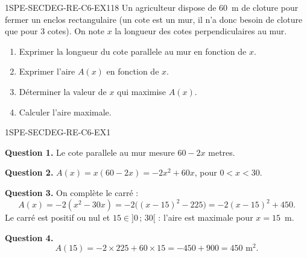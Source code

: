 


\begin{exercice}{1SPE-SECDEG-RE-C6-EX1}{1}{8}
Un agriculteur dispose de $60$~m de cloture pour fermer un enclos rectangulaire (un cote est un mur, il n'a donc besoin de cloture que pour $3$ cotes). On note $x$ la longueur des cotes perpendiculaires au mur.
\begin{enumerate}
  \item Exprimer la longueur du cote parallele au mur en fonction de $x$.
  \item Exprimer l'aire $A(x)$ en fonction de $x$.
  \item Déterminer la valeur de $x$ qui maximise $A(x)$.
  \item Calculer l'aire maximale.
\end{enumerate}
\end{exercice}


\begin{corrige}{1SPE-SECDEG-RE-C6-EX1}


\textbf{Question 1.} Le cote parallele au mur mesure $60 - 2x$ metres.

\textbf{Question 2.} $A(x) = x(60 - 2x) = -2x^2 + 60x$, pour $0<x<30$.


\textbf{Question 3.} On complète le carré :
\[
A(x)=-2(x^2-30x)=-2\bigl((x-15)^2-225\bigr)=-2(x-15)^2+450.
\]
Le carré est positif ou nul et $15\in]0\,;\,30[$ : l'aire est maximale pour $x = 15$~m.

\textbf{Question 4.}
\[
A(15) = -2 \times 225 + 60 \times 15 = -450 + 900 = 450 \text{ m}^2.
\]

\end{corrige}

